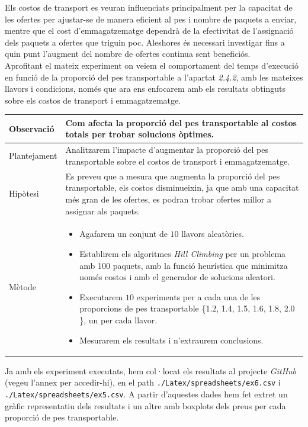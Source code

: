 \documentclass[a4paper]{article}
\begin{document}
	Els costos de transport es veuran influenciats principalment per la capacitat de les ofertes per ajustar-se de manera eficient al pes i nombre de paquets a enviar, mentre que el cost d'emmagatzematge dependrà de la efectivitat de l'assignació dels paquets a ofertes que triguin poc. Aleshores és necessari investigar fins a quin punt l'augment del nombre de ofertes continua sent beneficiós.\\
	
	Aprofitant el mateix experiment on veiem el comportament del temps d'execució en funció de la proporció del pes transportable a l'apartat \textit{2.4.2}, amb les mateixes llavors i condicions, només que ara ens enfocarem amb els resultats obtinguts sobre els costos de transport i emmagatzematge.\\
		\begin{table}[ht]
		\centering
		\begin{tabular}{|l|p{10cm}|}
			\hline
			Observació & Com afecta la proporció del pes transportable al costos totals per trobar solucions òptimes.\\
			\hline
			Plantejament & Analitzarem l'impacte d'augmentar la proporció del pes transportable sobre el costos de transport i emmagatzematge. \\
			\hline
			Hipòtesi & Es preveu que a mesura que augmenta la proporció del pes transportable, els costos disminueixin, ja que amb una capacitat més gran de les ofertes, es podran trobar ofertes millor a assignar als paquets.\\
			\hline
			Mètode &
			\begin{itemize}
				\item Agafarem un conjunt de $10$ llavors aleatòries.
				\item Establirem els algoritmes \textit{Hill Climbing} per un problema amb 100 paquets, amb la funció heurística que minimitza només costos i amb el generador de solucions aleatori.
				\item Executarem $10$ experiments per a cada una de les proporcions de pes transportable \{1.2, 1.4, 1.5, 1.6, 1.8, 2.0 \}, un per cada llavor.
				\item Mesurarem els resultats i n'extraurem conclusions.
			\end{itemize} \\
			\hline
		\end{tabular}
		\label{tab:exp5_apartats}
	\end{table}
	
	Ja amb els experiment executats, hem col·locat els resultats al projecte \textit{GitHub} (vegeu l'annex per accedir-hi), en el path \texttt{./Latex/spreadsheets/ex6.csv} i \texttt{./Latex/spreadsheets/ex5.csv}. A partir d'aquestes dades hem fet extret un gràfic representatiu dels resultats i un altre amb boxplots dels preus per cada proporció de pes transportable.
	
\end{document}
